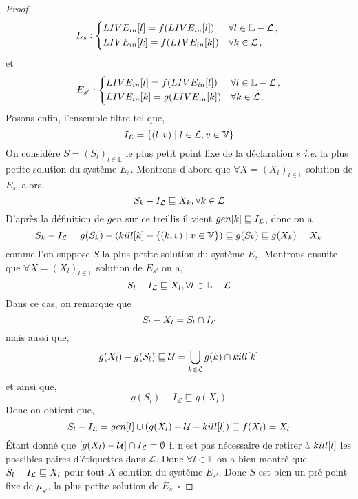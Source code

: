 \documentclass[a4paper, 12pt]{article}
\begin{document}
\begin{proof}
	\[
	E_s :
	\begin{dcases*}
		\livein{l} = f(\livein{l}) &$\forall l \in \mathbb{L} - \mathcal{L}$\,, \\
		\livein{k} = f(\livein{k}) &$\forall k \in \mathcal{L}$\,,
	\end{dcases*}
	\]
	et
	\[
	E_{s'} :
	\begin{dcases*}
		\livein{l} = f(\livein{l}) &$\forall l \in \mathbb{L} - \mathcal{L}$\,,\\
		\livein{k} = g(\livein{k}) &$\forall k \in \mathcal{L}$\,.
	\end{dcases*}
	\]
	Posons enfin, l'ensemble filtre tel que,
	\[
		I_{\mathcal{L}} = \{(l, v) \mid l \in \mathcal{L}, v \in \mathbb{V}\}
	\]
	On considère $S = (S_l)_{l\in \mathbb{L}}$ le plus petit point fixe de la déclaration $s$ \textit{i.e.} la plus petite solution du système $E_s$.
	Montrons d'abord que $\forall X = (X_l)_{l\in \mathbb{L}}$ solution de $E_{s'}$ alors,
	\[S_k - I_{\mathcal{L}} \sqsubseteq X_k, \forall k \in \mathcal{L}\]
	D'après la définition de $gen$ sur ce treillis il vient $gen[k] \sqsubseteq I_{\mathcal{L}}$, donc on a
	\[S_k - I_{\mathcal{L}} = g(S_k) - (kill[k] - \{(k, v) \mid v \in \mathbb{V}\}) \sqsubseteq g(S_k) \sqsubseteq g(X_k) = X_k\]
	comme l'on suppose $S$ la plus petite solution du système $E_s$.
	Montrons ensuite que $\forall X = (X_l)_{l\in \mathbb{L}}$ solution de $E_{s'}$ on a,
	\[
		S_l - I_{\mathcal{L}} \sqsubseteq X_l, \forall l \in \mathbb{L} - \mathcal{L}
	\]
	Dans ce cas, on remarque que 
	\[S_l - X_l = S_l \cap I_{\mathcal{L}}\] 
	mais aussi que, 
	\[g(X_l) - g(S_l) \sqsubseteq \mathcal{U} = \bigcup\limits_{k\in \mathcal{L}} g(k) \cap kill[k]\]
	et ainsi que,
	\[g(S_l) - I_{\mathcal{L}} \sqsubseteq g(X_l)\]
	Donc on obtient que,
	\[
		S_l - I_{\mathcal{L}} = gen[l] \cup (g(X_l) - \mathcal{U} - kill[l]) \sqsubseteq f(X_l) = X_l
	\]
	Étant donné que $[g(X_l) - \mathcal{U}] \cap I_{\mathcal{L}} = \emptyset$ il n'est pas nécessaire de retirer à $kill[l]$ les possibles
	paires d'étiquettes dans $\mathcal{L}$.
	Donc $\forall l \in \mathbb{L}$ on a bien montré que $S_l - I_{\mathcal{L}} \sqsubseteq X_l$ pour tout $X$ solution du système $E_{s'}$.
	Donc $S$ est bien un pré-point fixe de $\mu_{s'}$, la plus petite solution de $E_{s'}$.\hfill$\square$ 
\end{proof}
\end{document}
